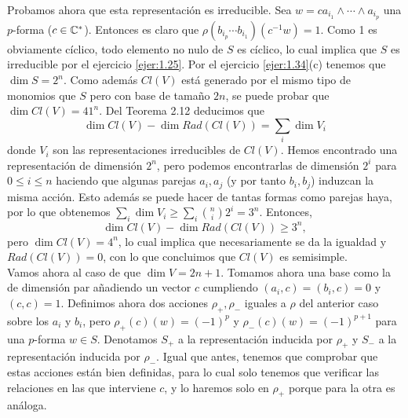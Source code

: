 \documentclass[twoside]{article}
\begin{document}
\begin{enumerate}[(i)]
Probamos ahora que esta representación es irreducible. Sea $w=ca_{i_1}\land\cdots\land a_{i_p}$ una $p$-forma ($c\in\mathbb{C}^*$). Entonces es claro que $\rho(b_{i_p}\cdots b_{i_1})(c^{-1}w)=1$. Como 1 es obviamente cíclico, todo elemento no nulo de $S$ es cíclico, lo cual implica que $S$ es irreducible por el ejercicio \ref{ejer:1.25}. Por el ejercicio \ref{ejer:1.34}(c) tenemos que $\dim S=2^n$. Como además $Cl(V)$ está generado por el mismo tipo de monomios que $S$ pero con base de tamaño $2n$, se puede probar que $\dim Cl(V)=  41^{n}$. Del Teorema 2.12 deducimos que 
$$\dim Cl(V)-\dim Rad(Cl(V))=\sum_i\dim V_i$$ donde $V_i$ son las representaciones irreducibles de $Cl(V)$. Hemos encontrado una representación de dimensión $2^n$, pero podemos encontrarlas de dimensión $2^i$ para  $0\leq i\leq n$ haciendo que algunas parejas $a_i,a_j$ (y por tanto $b_i,b_j$) induzcan la misma acción. Esto además se puede hacer de tantas formas como parejas haya, por lo que obtenemos $\sum_i\dim V_i\geq \sum_i \binom{n}{i}2^i = 3^n$. Entonces, 
$$\dim Cl(V)-\dim Rad(Cl(V))\geq 3^n,$$
 pero $\dim Cl(V)= 4^n$, lo cual implica que necesariamente se da la igualdad y $Rad(Cl(V))=0$, con lo que concluimos que $Cl(V)$ es semisimple.\\

Vamos ahora al caso de que $\dim V=2n+1$. Tomamos ahora una base como la de dimensión par añadiendo un vector $c$ cumpliendo $(a_i,c)=(b_i,c)=0$ y $(c,c)=1$. Definimos ahora dos acciones $\rho_+,\rho_-$ iguales a $\rho$ del anterior caso sobre los $a_i$ y $b_i$, pero $\rho_+(c)(w)=(-1)^p$ y $\rho_-(c)(w)=(-1)^{p+1}$ para una $p$-forma $w\in S$. Denotamos $S_+$ a la representación inducida por $\rho_+$ y $S_-$ a la representación inducida por $\rho_-$. Igual que antes, tenemos que comprobar que estas acciones están bien definidas, para lo cual solo tenemos que verificar las relaciones en las que interviene $c$, y lo haremos solo en $\rho_+$ porque para la otra es análoga.


\end{enumerate}
\end{document}
